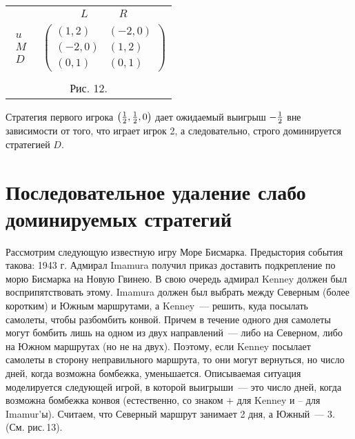 \begin{center}
\begin{tabular}{cc}
&$\begin{array}{cc} L\quad &\quad R \end{array}$\\
$\begin{array}{c} u\\ M\\ D\end{array}$& $\left(\begin{array}{cc}
(1,2)&(-2,0)\\
(-2,0)&(1,2)\\
(0,1)&(0,1) \end{array}\right)$\\
\multicolumn{2}{c}{}\\
\multicolumn{2}{c}{Рис. 12.}\\
\end{tabular}
\end{center}

Стратегия первого игрока $\left({1\over 2}, {1\over 2},0\right)$
дает ожидаемый выигрыш $-{1\over 2}$ вне зависимости от того, что
играет игрок 2, а следовательно, строго доминируется стратегией $D$.


\section {Последовательное удаление слабо доминируемых стратегий}

Рассмотрим следующую известную игру Море Бисмарка. Предыстория
события такова:  1943 г. Адмирал Imamura получил приказ доставить
подкрепление по морю Бисмарка на Новую Гвинею.  В свою очередь
адмирал Kenney должен был восприпятствовать этому. Imamura должен
был выбрать между Северным (более коротким) и Южным маршрутами, а
Kenney~--- решить, куда посылать самолеты, чтобы разбомбить
конвой. Причем в течение одного дня самолеты могут бомбить лишь на
одном из двух направлений~--- либо на Северном, либо на Южном
маршрутах (но не на двух). Поэтому, если Kenney посылает самолеты
в сторону неправильного маршрута, то они могут вернуться, но число
дней, когда возможна бомбежка, уменьшается. Описываемая ситуация
моделируется следующей игрой, в которой выигрыши~--- это число
дней, когда возможна бомбежка конвоя (естественно, со знаком + для
Kenney и -- для Imamur'ы).  Считаем, что Северный маршрут занимает
2 дня, а Южный~--- 3. (См. рис.\,13).


